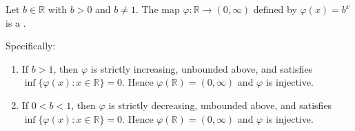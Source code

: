 \begin{proposition} \label{proposition:base_b_exponentiation_is_bijective_from_R_to_positive_reals}
    Let $b \in \mathbb{R}$ with $b > 0$ and $b \neq 1$. The map $\varphi : \mathbb{R} \to (0, \infty)$ defined by $\varphi(x) = b^x$ is a .

    Specifically:
    \begin{enumerate}
        \item If $b > 1$, then $\varphi$ is strictly increasing, unbounded above, and satisfies $\inf\{\varphi(x) : x \in \mathbb{R}\} = 0$. Hence $\varphi(\mathbb{R}) = (0, \infty)$ and $\varphi$ is injective.
        \item If $0 < b < 1$, then $\varphi$ is strictly decreasing, unbounded above, and satisfies $\inf\{\varphi(x) : x \in \mathbb{R}\} = 0$. Hence $\varphi(\mathbb{R}) = (0, \infty)$ and $\varphi$ is injective.
    \end{enumerate}
\end{proposition}

